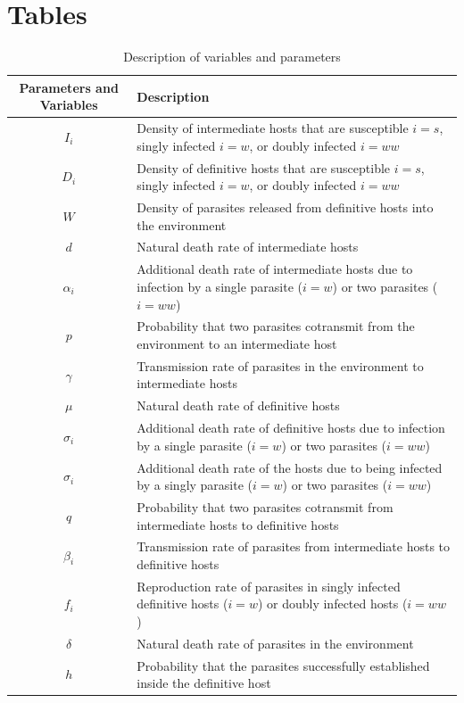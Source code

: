 \documentclass[11pt]{article}
\begin{document}
\section*{Tables}


\begin{table}[!ht]
\caption{Description of variables and parameters}
\label{table:varpardescription}
\centering
\begin{tabular}{c|p{10cm}}%
\hline
Parameters and Variables    &  Description  \\
\hline
$I_i$  & Density of intermediate hosts that are susceptible $i=s$, singly infected $i=w$, or doubly infected $i=ww$ \\
\hline
$D_i$ & Density of definitive hosts that are susceptible $i=s$, singly infected $i=w$, or doubly infected $i=ww$ \\
\hline
$W$ & Density of parasites released from definitive hosts into the environment \\
\hline
$d$ & Natural death rate of intermediate hosts \\
\hline
$\alpha_i$ & Additional death rate of intermediate hosts due to infection by a single parasite ($i = w$) or two parasites ($i = ww$) \\
\hline
$p$ & Probability that two parasites cotransmit from the environment to an intermediate host \\
\hline
$\gamma$ & Transmission rate of parasites in the environment to intermediate hosts \\
\hline
$\mu$ & Natural death rate of definitive hosts \\
\hline
$\sigma_i$ & Additional death rate of definitive hosts due to infection by a single parasite ($i = w$) or two parasites ($i = ww$) \\
\hline
$\sigma_i$ & Additional death rate of the hosts due to being infected by a singly parasite ($i = w$) or two parasites ($i = ww$) \\
\hline
$q$ & Probability that two parasites cotransmit from intermediate hosts to definitive hosts \\
\hline
$\beta_i$ & Transmission rate of parasites from intermediate hosts to definitive hosts \\
\hline
$f_i$ & Reproduction rate of parasites in singly infected definitive hosts ($i = w$) or doubly infected hosts ($i = ww$)\\
\hline
$\delta$ & Natural death rate of parasites in the environment \\
\hline 
$h$ & Probability that the parasites successfully established inside the definitive host 
\end{tabular}
\bigskip{}
\end{table}
\end{document}
